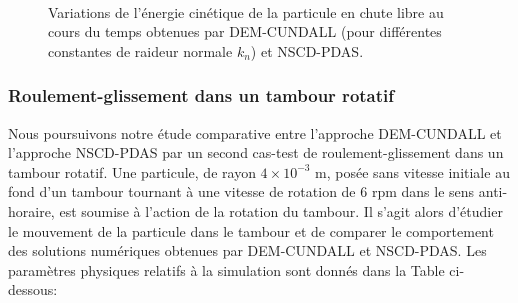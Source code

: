 \begin{figure}[h!]
\hspace{\fill}
   \\
\caption{\centering Variations de l'énergie cinétique de la particule en chute libre au cours du temps obtenues par DEM-CUNDALL (pour différentes constantes de raideur normale $k_n$) et NSCD-PDAS.}\label{fig84}
\end{figure}

\subsubsection{Roulement-glissement dans un tambour rotatif}

Nous poursuivons notre étude comparative entre l'approche DEM-CUNDALL et l'approche NSCD-PDAS par un second cas-test de roulement-glissement dans un tambour rotatif. Une particule, de rayon $4\times10^{-3}$ m, posée sans vitesse initiale au fond d'un tambour tournant à une vitesse de rotation de $6$ rpm dans le sens anti-horaire, est soumise à l'action de la rotation du tambour. Il s'agit alors d'étudier le mouvement de la particule dans le tambour et de comparer le comportement des solutions numériques obtenues par DEM-CUNDALL et NSCD-PDAS. Les paramètres physiques relatifs à la simulation sont donnés dans la Table ci-dessous:

